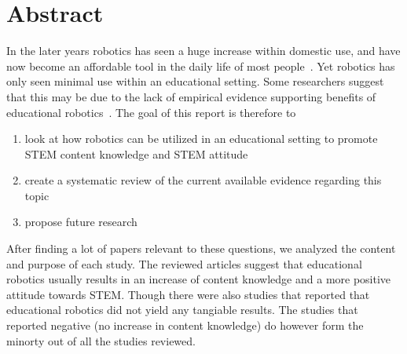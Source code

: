 \section*{Abstract}
	In the later years robotics has seen a huge increase within domestic use, and have now become an affordable tool in the daily life of most people~\cite{hsiu2003designing}.
	Yet robotics has only seen minimal use within an educational setting. Some researchers suggest that this may be due to the lack of empirical evidence
	supporting benefits of educational robotics~\cite{williams2007acquisition}. 
	The goal of this report is therefore to 
	\begin{enumerate}
		\item look at how robotics can be utilized in an educational setting to promote STEM content knowledge and STEM attitude
		\item create a systematic review of the current available evidence regarding this topic
		\item propose future research
	\end{enumerate}
	
	\bigskip\noindent
	After finding a lot of papers relevant to these questions, we analyzed the content and purpose of each study.
	The reviewed articles suggest that educational robotics usually results in an increase of content knowledge and a more positive attitude towards STEM. 
	Though there were also studies that reported that educational robotics did not yield any tangiable results. 
	The studies that reported negative (no increase in content knowledge) do however form the minorty out of all the studies reviewed. 
	